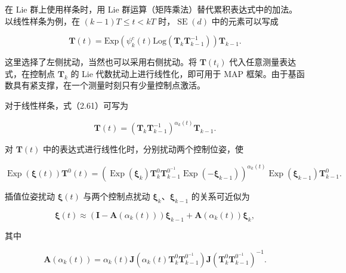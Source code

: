在 Lie 群上使用样条时，用 Lie 群运算（矩阵乘法）替代累积表达式中的加法。以线性样条为例，在 $(k-1)T\le t<kT$ 时，$\operatorname{SE}(d)$ 中的元素可以写成

\begin{equation}
\boldsymbol {T} (t) = \mathrm{Exp} \left(\psi_ {k} ^ {c} (t) \mathrm{Log} \left(\boldsymbol {T} _ {k} \boldsymbol {T} _ {k - 1} ^ {- 1}\right)\right) \boldsymbol {T} _ {k - 1}.\tag{2.61}
\end{equation}

这里选择了左侧扰动，当然也可以采用右侧扰动。将 $\pmb T(t_i)$ 代入任意测量表达式，在控制点 $\pmb T_k$ 的 Lie 代数扰动上进行线性化，即可用于 MAP 框架。由于基函数具有紧支撑，在一个测量时刻只有少量控制点激活。

对于线性样条，式（2.61）可写为

\begin{equation}
\boldsymbol {T} (t) = \left(\boldsymbol {T} _ {k} \boldsymbol {T} _ {k - 1} ^ {- 1}\right) ^ {\alpha_ {k} (t)} \boldsymbol {T} _ {k - 1}.\tag{2.62}
\end{equation}

对 $\pmb T(t)$ 中的表达式进行线性化时，分别扰动两个控制位姿，使

\begin{equation}
\operatorname{Exp} (\boldsymbol {\xi} (t)) \boldsymbol {T} ^ {0} (t) = \left(\operatorname{Exp} (\boldsymbol {\xi} _ {k}) \boldsymbol {T} _ {k} ^ {0} \boldsymbol {T} _ {k - 1} ^ {0^{-1}} \operatorname{Exp} (- \boldsymbol {\xi} _ {k - 1})\right) ^ {\alpha_ {k} (t)} \operatorname{Exp} (\boldsymbol {\xi} _ {k - 1}) \boldsymbol {T} _ {k - 1} ^ {0}.\tag{2.63}
\end{equation}

插值位姿扰动 $\pmb\xi(t)$ 与两个控制点扰动 $\pmb\xi_k$、$\pmb\xi_{k-1}$ 的关系可近似为

\begin{equation}
\boldsymbol {\xi} (t) \approx (\boldsymbol {I} - \boldsymbol {A} (\alpha_ {k} (t))) \boldsymbol {\xi} _ {k - 1} + \boldsymbol {A} (\alpha_ {k} (t)) \boldsymbol {\xi} _ {k},\tag{2.64}
\end{equation}

其中

\begin{equation}
\boldsymbol {A} \left(\alpha_ {k} (t)\right) = \alpha_ {k} (t) \boldsymbol {J} \left(\alpha_ {k} (t) \boldsymbol {T} _ {k} ^ {0} \boldsymbol {T} _ {k - 1} ^ {0^{-1}}\right) \boldsymbol {J} \left(\boldsymbol {T} _ {k} ^ {0} \boldsymbol {T} _ {k - 1} ^ {0^{-1}}\right) ^ {- 1}.\tag{2.65}
\end{equation}

